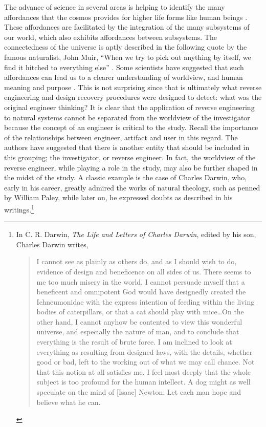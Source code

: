 The advance of science in several areas is helping to identify the many
affordances that the cosmos provides for higher life forms like human
beings . These affordances are facilitated by the
integration of the many subsystems of our world, which also exhibits
affordances between subsystems. The connectedness of the universe is
aptly described in the following quote by the famous naturalist, John
Muir, “When we try to pick out anything by itself, we find it hitched
to everything else” \citep[][p.~110]{muir1988}. Some scientists have suggested
that such affordances can lead us to a clearer understanding of
worldview, and human meaning and purpose \citep{denton1998}. This is
not surprising since that is ultimately what reverse engineering and
design recovery procedures were designed to detect: what was the
original engineer thinking? It is clear that the application of reverse
engineering to natural systems cannot be separated from the worldview
of the investigator because the concept of an engineer is critical to
the study. Recall the importance of the relationships between engineer,
artifact and user in this regard. The authors have suggested that there
is another entity that should be included in this grouping; the
investigator, or reverse engineer. In fact, the worldview of the
reverse engineer, while playing a role in the study, may also be
further shaped in the midst of the study. A classic example is the case
of Charles Darwin, who, early in his career, greatly admired the works
of natural theology, such as penned by William Paley, while later on,
he expressed doubts as described in his writings.\footnote{
In C. R. Darwin, \textit{The Life and Letters of
Charles Darwin}, edited by his son, Charles Darwin writes, 

\begin{quote}
I cannot see as plainly as others do,
and as I should wish to do, evidence of design and beneficence on all
sides of us. There seems to me too much misery in the world.  I cannot
persuade myself that a beneficent and omnipotent God would have
designedly created the Ichneumonidae with the express intention of
feeding within the living bodies of caterpillars, or that a cat should
play with mice…On the other hand, I cannot anyhow be contented to view
this wonderful universe, and especially the nature of man, and to
conclude that everything is the result of brute force. I am inclined to
look at everything as resulting from designed laws, with the details,
whether good or bad, left to the working out of what we may call
chance. Not that this notion at all satisfies me. I feel most deeply
that the whole subject is too profound for the human intellect. A dog
might as well speculate on the mind of [Isaac] Newton. Let each man
hope and believe what he can. \citep[][p.~312]{darwinll} %
\end{quote}
}

